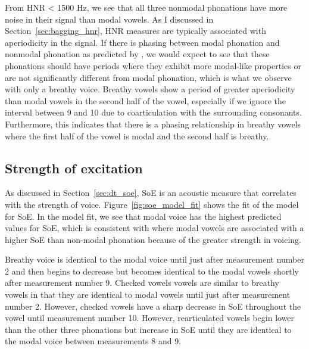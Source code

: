 From HNR < 1500 Hz, we see that all three nonmodal phonations have more noise in their signal than modal vowels. As I discussed in Section~\ref{sec:bagging_hnr}, HNR measures are typically associated with aperiodicity in the signal. If there is phasing between modal phonation and nonmodal phonation as predicted by \citet{silvermanLaryngealComplexityOtomanguean1997}, we would expect to see that these phonations should have periods where they exhibit more modal-like properties or are not significantly different from modal phonation, which is what we observe with only a breathy voice. Breathy vowels show a period of greater aperiodicity than modal vowels in the second half of the vowel, especially if we ignore the interval between 9 and 10 due to coarticulation with the surrounding consonants. Furthermore, this indicates that there is a phasing relationship in breathy vowels where the first half of the vowel is modal and the second half is breathy. 
\subsection{Strength of excitation} \label{sec:model_soe}

As discussed in Section~\ref{sec:dt_soe}, SoE is an acoustic measure that correlates with the strength of voice. Figure~\ref{fig:soe_model_fit} shows the fit of the model for SoE. In the model fit, we see that modal voice has the highest predicted values for SoE, which is consistent with \citet{garellekVoicingGlottalConsonants2021} where modal vowels are associated with a higher SoE than non-modal phonation because of the greater strength in voicing. 

Breathy voice is identical to the modal voice until just after measurement number 2 and then begins to decrease but becomes identical to the modal vowels shortly after measurement number 9. Checked vowels vowels are similar to breathy vowels in that they are identical to modal vowels until just after measurement number 2. However, checked vowels have a sharp decrease in SoE throughout the vowel until measurement number 10. However, rearticulated vowels begin lower than the other three phonations but increase in SoE until they are identical to the modal voice between measurements 8 and 9. 

